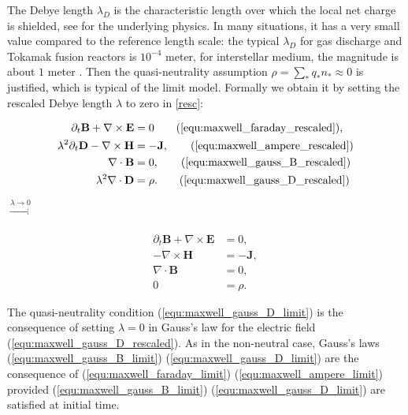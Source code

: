 \documentclass{article}
\begin{document}
The Debye length $\lambda_D$ is the characteristic length over which the local net charge is
shielded, see \cite[Sec.~1.4]{chen2016} for the underlying physics. In many situations, it
has a very small value compared to the reference length scale: the typical $\lambda_D$ for
gas discharge and Tokamak fusion reactors is $10^{-4}$ meter, for interstellar medium, the
magnitude is about $1$ meter \cite[Chapt.~20]{Blandford_2013}. Then the quasi-neutrality
assumption $\rho = \sum_* q_*n_* \approx 0$ is justified, which is typical of the limit
model.  Formally we obtain it by setting the rescaled Debye length $\lambda$ to zero in
\eqref{resc}:
\begin{center}
    \begin{minipage}{0.3\textwidth}
    \begin{align*}
        \partial_t \mathbf{B} + \nabla \times \mathbf{E} &= 0 \tag{\ref{equ:maxwell_faraday_rescaled}},\\ 
        \lambda^2 \partial_t \mathbf{D} - \nabla \times \mathbf{H} &= - \mathbf{J}, \tag{\ref{equ:maxwell_ampere_rescaled}}\\
        \nabla \cdot \mathbf{B} &= 0, \tag{\ref{equ:maxwell_gauss_B_rescaled}}\\
        \lambda^2 \nabla \cdot \mathbf{D} &= \rho. \tag{\ref{equ:maxwell_gauss_D_rescaled}}
    \end{align*}
\end{minipage}
\hspace{0.6cm}$\xrightarrow[]{\lambda \rightarrow 0}$
\begin{minipage}{0.3\textwidth}
  \begin{subequations}
    \label{limit}
\begin{align}
    \partial_t \mathbf{B} + \nabla \times \mathbf{E} &= 0, \label{equ:maxwell_faraday_limit} \\ 
    - \nabla \times \mathbf{H} &= - \mathbf{J}, \label{equ:maxwell_ampere_limit} \\
    \nabla \cdot \mathbf{B} &= 0,  \label{equ:maxwell_gauss_B_limit}\\
     0 &= \rho. \label{equ:maxwell_gauss_D_limit}
\end{align}
\end{subequations}
\end{minipage}
\end{center}
The quasi-neutrality condition (\ref{equ:maxwell_gauss_D_limit}) is the consequence of
setting $\lambda = 0$ in Gauss's law for the electric field
(\ref{equ:maxwell_gauss_D_rescaled}). As in the non-neutral case, Gauss's laws
(\ref{equ:maxwell_gauss_B_limit}) (\ref{equ:maxwell_gauss_D_limit}) are the consequence of
(\ref{equ:maxwell_faraday_limit}) (\ref{equ:maxwell_ampere_limit}) provided
(\ref{equ:maxwell_gauss_B_limit}) (\ref{equ:maxwell_gauss_D_limit}) are satisfied at
initial time.
\end{document}
